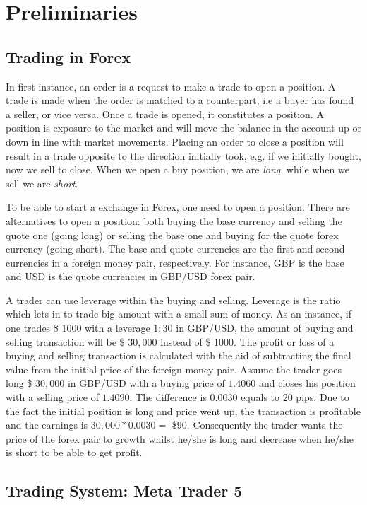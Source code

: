 \section{Preliminaries}

\subsection{Trading in Forex}
In first instance, an order is a request to make a trade to open a position.
A trade is made when the order is matched to a counterpart, i.e a buyer has found a seller, or vice versa.
Once a trade is opened, it constitutes a position. A position is exposure to the market and will move the balance in the account up or down in line with market movements. Placing an order to close a position will result in a trade opposite to the direction initially took, e.g. if we initially bought, now we sell to close. When we open a buy position, we are \textit{long}, while when we sell we are \textit{short}.

To be able to start a exchange in Forex, one need to open a position. There are alternatives to open a position: both buying the base currency and selling the quote one (going long) or selling the base one and buying for the quote forex currency (going short). The base and quote currencies are the first and second currencies in a foreign money pair, respectively. For instance, GBP is the base and USD is the quote currencies in GBP/USD forex pair.

A trader can use leverage within the buying and selling. Leverage is the ratio which lets in to trade big amount with a small sum of money. As an instance, if one trades \$ $1000$ with a leverage $1:30$ in GBP/USD, the amount of buying and selling transaction will be \$ $30,000$ instead of \$ $1000$.
The profit or loss of a buying and selling transaction is calculated with the aid of subtracting the final value from the initial price of the foreign money pair. Assume the trader goes long  \$ $30,000$ in GBP/USD with a buying price of $1.4060$ and closes his position with a selling price of $1.4090$. The difference is $0.0030$ equals to 20 pips. Due to the fact the initial position is long and price went up, the transaction is profitable and the earnings is $30,000 * 0.0030 =$ \$90. Consequently the trader wants the price of the forex pair to growth whilst he/she is long and decrease when he/she is short to be able to get profit.

\subsection{Trading System: Meta Trader 5}

